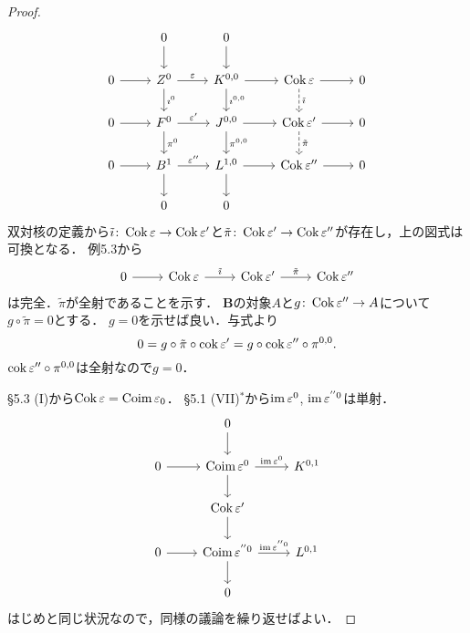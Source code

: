 \begin{proof}
  \[
  \begin{tikzcd}
    & 0 \arrow[d] & 0 \arrow[d] \\
    0 \arrow[r] & Z^0 \arrow[r, "\varepsilon"]\arrow[d, "\imath^0"] & K^{0, 0} \arrow[d, "\imath^{0, 0}"]\arrow[r] & \Cok\varepsilon \arrow[d, "\tilde\imath", dashed]\arrow[r] & 0 \\
    0 \arrow[r] & F^0 \arrow[r, "\varepsilon'"]\arrow[d, "\pi^0"] & J^{0, 0} \arrow[d, "\pi^{0, 0}"]\arrow[r] & \Cok\varepsilon' \arrow[d, "\tilde\pi", dashed]\arrow[r] & 0 \\
    0 \arrow[r] & B^1 \arrow[r, "\varepsilon''"]\arrow[d] & L^{1, 0} \arrow[d]\arrow[r] & \Cok\varepsilon''\arrow[r] & 0 \\
    & 0 & 0
  \end{tikzcd}
  \]
  双対核の定義から\(\tilde\imath \colon \operatorname{Cok}\varepsilon \to \operatorname{Cok}\varepsilon'\)と\(\tilde\pi \colon \operatorname{Cok}\varepsilon' \to \operatorname{Cok}\varepsilon''\)が存在し，上の図式は可換となる．
  例5.3から
  \[
  \begin{tikzcd}
    0 \arrow[r] & \Cok\varepsilon \arrow[r, "\tilde\imath"] & \Cok\varepsilon' \arrow[r, "\tilde\pi"] & \Cok\varepsilon''
  \end{tikzcd}
  \]
  は完全．\(\tilde\pi\)が全射であることを示す．
  \(\boldsymbol{B}\)の対象\(A\)と\(g\colon \operatorname{Cok}\varepsilon'' \to A\)について\(g\circ\tilde\pi = 0\)とする．
  \(g=0\)を示せば良い．与式より
  \[ 0 = g\circ\tilde\pi\circ\operatorname{cok}\varepsilon' = g\circ\operatorname{cok}\varepsilon''\circ\pi^{0, 0} . \]
  \(\operatorname{cok}\varepsilon''\circ\pi^{0, 0}\)は全射なので\(g = 0\)．

  \S5.3 (I)から\(\operatorname{Cok}\varepsilon = \operatorname{Coim}\varepsilon_0\)．
  \S5.1 (VII)\(^\ast\)から\(\operatorname{im}\varepsilon^0\), \(\operatorname{im}\varepsilon^{''0}\)は単射．
  \[
  \begin{tikzcd}
    & 0 \arrow[d] & \\
    0 \arrow[r] & \Coim\varepsilon^0 \arrow[d]\arrow[r, "\im\varepsilon^0"] & K^{0, 1} \\
    & \Cok\varepsilon' \arrow[d] & \\
    0 \arrow[r] & \Coim\varepsilon^{''0} \arrow[d]\arrow[r, "\im\varepsilon^{''0}"] & L^{0, 1} \\
    & 0 &
  \end{tikzcd}
  \]
  はじめと同じ状況なので，同様の議論を繰り返せばよい．
\end{proof}

